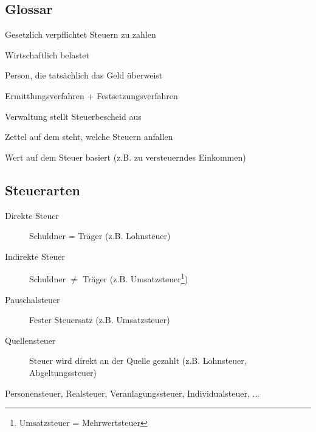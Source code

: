 \documentclass{beamer}
\begin{document}
		\subsection{Glossar}
	
			\begin{frame}
				\begin{description}[Steuerfestsetzung]
					\item[Steuerschuldner] Gesetzlich verpflichtet Steuern zu zahlen
					\item[Steuerträger] Wirtschaftlich belastet
					\item[Steuerzahler] Person, die tatsächlich das Geld überweist
					\pause
					\item[Veranlagung] Ermittlungsverfahren + Festsetzungsverfahren
					\item[Steuerfestsetzung] Verwaltung stellt Steuerbescheid aus
					\pause
					\item[Steuerbescheid] Zettel auf dem steht, welche Steuern anfallen
					\item[Bemessungsgrundlage] Wert auf dem Steuer basiert (z.B. zu versteuerndes Einkommen)
				\end{description}
			\end{frame}
	
		\subsection{Steuerarten}
		
			\begin{frame}
				\begin{description}
					\item[Direkte Steuer] Schuldner = Träger (z.B. Lohnsteuer)
					\item[Indirekte Steuer] Schuldner $\neq$ Träger (z.B. Umsatzsteuer\footnote{Umsatzsteuer = Mehrwertsteuer})
					\item[Pauschalsteuer] Fester Steuersatz (z.B. Umsatzsteuer)
					\item[Quellensteuer] Steuer wird direkt an der Quelle gezahlt (z.B. Lohnsteuer, Abgeltungssteuer)
				\end{description}\n
				Personensteuer, Realsteuer, Veranlagungssteuer, Individualsteuer, ...
			\end{frame}
	
\end{document}
